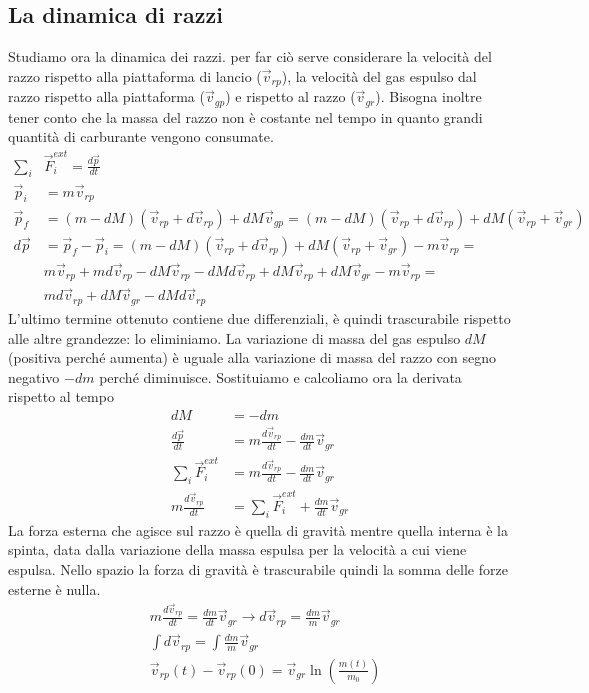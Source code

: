 \subsection{La dinamica di razzi}
Studiamo ora la dinamica dei razzi. per far ciò serve considerare la velocità del razzo rispetto alla piattaforma di lancio ($\vec{v}_{rp}$), la velocità del gas espulso dal razzo rispetto alla piattaforma ($\vec{v}_{gp}$) e rispetto al razzo ($\vec{v}_{gr}$). Bisogna inoltre tener conto che la massa del razzo non è costante nel tempo in quanto grandi quantità di carburante vengono consumate. 
\begin{align*}
	\sum_i &\vec{F}_i^{ext} = \frac{d\vec{p}}{dt}\\
	\vec{p}_i &= m \vec{v}_{rp}\\
	\vec{p}_f &= (m - dM) (\vec{v}_{rp}+d\vec{v}_{rp})+dM\vec{v}_{gp} = (m - dM) (\vec{v}_{rp}+d\vec{v}_{rp})+dM(\vec{v}_{rp}+\vec{v}_{gr})\\
	d\vec{p} &= \vec{p}_f - \vec{p}_i = (m - dM) (\vec{v}_{rp}+d\vec{v}_{rp})+dM(\vec{v}_{rp}+\vec{v}_{gr}) - m \vec{v}_{rp}=\\
	&m \vec{v}_{rp}+md\vec{v}_{rp}-dM \vec{v}_{rp}-dM d\vec{v}_{rp}+dM \vec{v}_{rp} + dM \vec{v}_{gr}-m\vec{v}_{rp}=\\ 
	&m d\vec{v}_{rp}+dM \vec{v}_{gr}-dM d\vec{v}_{rp}
\end{align*}
L'ultimo termine ottenuto contiene due differenziali, è quindi trascurabile rispetto alle altre grandezze: lo eliminiamo. La variazione di massa del gas espulso $dM$ (positiva perché aumenta) è uguale alla variazione di massa del razzo con segno negativo $-dm$ perché diminuisce. Sostituiamo e calcoliamo ora la derivata rispetto al tempo 
\begin{align*}
	dM &= -dm\\
	\frac{d\vec{p}}{dt} &= m \frac{d\vec{v}_{rp}}{dt} - \frac{dm}{dt} \vec{v}_{gr}\\
	\sum_i \vec{F}_i^{ext} &= m \frac{d\vec{v}_{rp}}{dt} - \frac{dm}{dt} \vec{v}_{gr}\\
	m \frac{d\vec{v}_{rp}}{dt} &= 	\sum_i \vec{F}_i^{ext} + \frac{dm}{dt} \vec{v}_{gr}
\end{align*}
La forza esterna che agisce sul razzo è quella di gravità mentre quella interna è la spinta, data dalla variazione della massa espulsa per la velocità a cui viene espulsa. Nello spazio la forza di gravità è trascurabile quindi la somma delle forze esterne è nulla.
\begin{align*}
	&m \frac{d\vec{v}_{rp}}{dt} = \frac{dm}{dt}\vec{v}_{gr} \rightarrow d\vec{v}_{rp} = \frac{dm}{m} \vec{v}_{gr}\\
	&\int d\vec{v}_{rp} = \int \frac{dm}{m} \vec{v}_{gr}\\
	&\vec{v}_{rp}(t)-\vec{v}_{rp}(0) = \vec{v}_{gr} \ln(\frac{m(t)}{m_0})
\end{align*}

